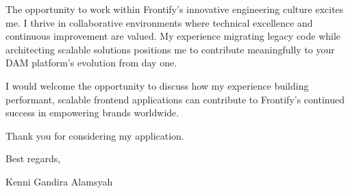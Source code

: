 \documentclass[a4paper, 11pt]{article}
\begin{document}
The opportunity to work within Frontify's innovative engineering culture excites me. I thrive in collaborative environments where technical excellence and continuous improvement are valued. My experience migrating legacy code while architecting scalable solutions positions me to contribute meaningfully to your DAM platform's evolution from day one.

I would welcome the opportunity to discuss how my experience building performant, scalable frontend applications can contribute to Frontify's continued success in empowering brands worldwide.

Thank you for considering my application.

\vspace{10pt}

Best regards,

Kenni Gandira Alamsyah
\end{document}
